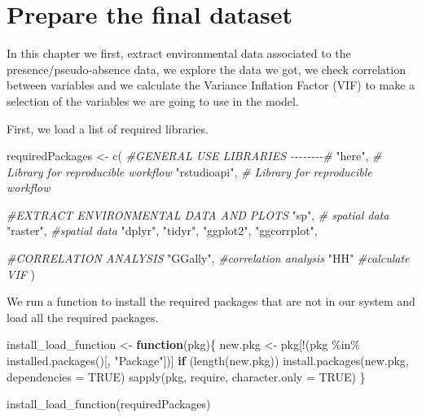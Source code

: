 \documentclass[
]{book}
\newenvironment{Shaded}{\begin{snugshade}}{\end{snugshade}}
\newcommand{\AttributeTok}[1]{\textcolor[rgb]{0.77,0.63,0.00}{#1}}
\newcommand{\CommentTok}[1]{\textcolor[rgb]{0.56,0.35,0.01}{\textit{#1}}}
\newcommand{\ConstantTok}[1]{\textcolor[rgb]{0.00,0.00,0.00}{#1}}
\newcommand{\ControlFlowTok}[1]{\textcolor[rgb]{0.13,0.29,0.53}{\textbf{#1}}}
\newcommand{\FunctionTok}[1]{\textcolor[rgb]{0.00,0.00,0.00}{#1}}
\newcommand{\NormalTok}[1]{#1}
\newcommand{\OtherTok}[1]{\textcolor[rgb]{0.56,0.35,0.01}{#1}}
\newcommand{\SpecialCharTok}[1]{\textcolor[rgb]{0.00,0.00,0.00}{#1}}
\newcommand{\StringTok}[1]{\textcolor[rgb]{0.31,0.60,0.02}{#1}}
\begin{document}
\hypertarget{prepare-the-final-dataset}{%
\chapter{Prepare the final dataset}\label{prepare-the-final-dataset}}

In this chapter we first, extract environmental data associated to the presence/pseudo-absence data, we explore the data we got, we check correlation between variables and we calculate the Variance Inflation Factor (VIF) to make a selection of the variables we are going to use in the model.

First, we load a list of required libraries.

\begin{Shaded}
\begin{Highlighting}[]
\NormalTok{requiredPackages }\OtherTok{\textless{}{-}} \FunctionTok{c}\NormalTok{(}
  \CommentTok{\#GENERAL USE LIBRARIES {-}{-}{-}{-}{-}{-}{-}{-}\#}
  \StringTok{"here"}\NormalTok{, }\CommentTok{\# Library for reproducible workflow}
  \StringTok{"rstudioapi"}\NormalTok{,  }\CommentTok{\# Library for reproducible workflow}
  
  \CommentTok{\#EXTRACT ENVIRONMENTAL DATA AND PLOTS}
  \StringTok{"sp"}\NormalTok{, }\CommentTok{\# spatial data}
  \StringTok{"raster"}\NormalTok{, }\CommentTok{\#spatial data}
  \StringTok{"dplyr"}\NormalTok{,}
  \StringTok{"tidyr"}\NormalTok{,}
  \StringTok{"ggplot2"}\NormalTok{,}
  \StringTok{"ggcorrplot"}\NormalTok{,}
  
  \CommentTok{\#CORRELATION ANALYSIS}
  \StringTok{"GGally"}\NormalTok{, }\CommentTok{\#correlation analysis}
  \StringTok{"HH"} \CommentTok{\#calculate VIF}
\NormalTok{    )}
\end{Highlighting}
\end{Shaded}

We run a function to install the required packages that are not in our system and load all the required packages.

\begin{Shaded}
\begin{Highlighting}[]
\NormalTok{install\_load\_function }\OtherTok{\textless{}{-}} \ControlFlowTok{function}\NormalTok{(pkg)\{}
\NormalTok{  new.pkg }\OtherTok{\textless{}{-}}\NormalTok{ pkg[}\SpecialCharTok{!}\NormalTok{(pkg }\SpecialCharTok{\%in\%} \FunctionTok{installed.packages}\NormalTok{()[, }\StringTok{"Package"}\NormalTok{])]}
  \ControlFlowTok{if}\NormalTok{ (}\FunctionTok{length}\NormalTok{(new.pkg))}
    \FunctionTok{install.packages}\NormalTok{(new.pkg, }\AttributeTok{dependencies =} \ConstantTok{TRUE}\NormalTok{)}
  \FunctionTok{sapply}\NormalTok{(pkg, require, }\AttributeTok{character.only =} \ConstantTok{TRUE}\NormalTok{)}
\NormalTok{\}}

\FunctionTok{install\_load\_function}\NormalTok{(requiredPackages)}
\end{Highlighting}
\end{Shaded}
\end{document}
